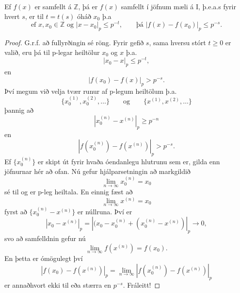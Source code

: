 \begin{setn}
Ef $f(x)$ er samfellt á $\mathbb{Z}$, þá er $f(x)$ samfellt í jöfnum mæli á I, þ.e.a.s fyrir hvert $s$, er til $t=t(s)$ óháð $x_0$ þ.a 
\begin{equation}
\mbox{ef   } x,x_0\in \mathbb{Z} \mbox{ og  } |x-x_0|_p \leq p^{-t}, \qquad \mbox{þá  } |f(x)-f(x_0)|_p \leq p^{-s}.
\end{equation}
\end{setn} 
\begin{proof}
G.r.f. að fullyrðingin sé röng. Fyrir gefið $s$, sama hversu stórt $t \geq 0$ er valið, eru þá til p-legar heiltölur $x_0$ og $x$ þ.a.
\begin{equation*}
|x_0-x|_p \leq p^{-t},
\end{equation*}
en
\begin{equation*}
|f(x_0)-f(x)|_p > p^{-s}.
\end{equation*}
Því megum við velja tvær runur af p-legum heiltölum þ.a.
\begin{equation*}
\{x_0^{(1)}, x_0^{(2)}, \ldots \} \qquad \mbox{og} \qquad \{x^{(1)}, x^{(2)}, \ldots\}
\end{equation*}
þannig að
\begin{equation*}
|x_0^{(n)}-x^{(n)} |_p \geq p^{-n}
\end{equation*}
en 
\begin{equation*}
|f(x_0^{(n)}) - f(x^{(n)})|_p > p^{-s}.
\end{equation*}
Ef $\{x_0^{(n)}\}$ er skipt út fyrir hvaða óendanlegu hlutrunu sem er, gilda enn jöfnurnar hér að ofan. 
Nú gefur hjálparsetningin að markgildið
\begin{equation*}
\lim_{n\rightarrow \infty} x_0^{(n)}  = x_0
\end{equation*}
sé til og er p-leg heiltala. En einnig fæst að
\begin{equation*}
\lim_{n\rightarrow \infty} x^{(n)} = x_0
\end{equation*}
 fyrst að $\{x_0^{(n)} - x^{(n)} \}$ er núllruna. Því er 
\begin{equation*}
|x_0-x^{(n)}|_p = |(x_0 - x_0^{(n)} + (x_0^{(n)} -x^{(n)}) |_p \rightarrow 0,
\end{equation*}
svo að samfelldnin gefur nú
\begin{equation*}
\lim_{n\rightarrow \infty} f(x^{(n)}) = f(x_0).
\end{equation*}
En þetta er ómögulegt því
\begin{equation*}
|f(x_0)-f(x^{(n)})|_p = \lim_{n\rightarrow \infty} |f(x_0^{(n)}) - f(x^{(n)})|_p
\end{equation*}
er annaðhvort ekki til eða stærra en $p^{-s}$. Fráleitt!
\end{proof}

